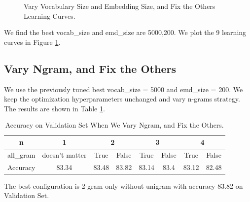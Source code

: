 \documentclass[10pt,a4paper]{article}
\begin{document}
\begin{figure}[!ht]
{}	
\caption{\label{fig:vocab_emd}Vary Vocabulary Size and Embedding Size,  and Fix the Others Learning Curves.}
\end{figure}

We find the best vocab\_size and emd\_size are 5000,200. We plot the 9 learning curves in Figure \ref{fig:vocab_emd}.

 
\subsection{Vary Ngram, and Fix the Others}
We use the previously tuned best vocab\_size = 5000 and emd\_size = 200. We keep the optimization hyperparameters unchanged and vary n-grams strategy. The results are shown in Table \ref{tab: ngram}.
\begin{table}[!ht]
\centering
\begin{tabular}{|c|c|c|c|c|c|c|c|}
\hline
n & 1 &\multicolumn{2}{|c|}{2} & \multicolumn{2}{|c|}{3} & \multicolumn{2}{|c|}{4}\\ \hline
all\_gram & doesn't matter & True & False & True & False & True & False \\ \hline
Accuracy & 83.34 & 83.48 & 83.82 & 83.14 & 83.4 & 83.12 & 82.48\\ \hline
\end{tabular}
\caption{\label{tab: ngram}Accuracy on Validation Set When We Vary Ngram, and Fix the Others.}
\end{table}
The best configuration is 2-gram only without unigram with accuracy 83.82 on Validation Set.
\end{document}
